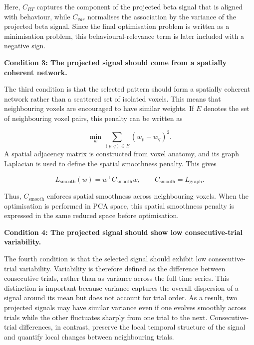 \documentclass[utf8]{frontiers_suppmat}
\begin{document}
Here, $C_{RT}$ captures the component of the projected beta signal that is aligned with behaviour, while $C_{var}$ normalises the association by the variance of the projected beta signal. Since the final optimisation problem is written as a minimisation problem, this behavioural-relevance term is later included with a negative sign.

\textbf{Condition 3: The projected signal should come from a spatially coherent network.}

The third condition is that the selected pattern should form a spatially coherent network rather than a scattered set of isolated voxels. This means that neighbouring voxels are encouraged to have similar weights. If $E$ denotes the set of neighbouring voxel pairs, this penalty can be written as

\begin{equation}
\min_w \sum_{(p,q)\in E} (w_p-w_q)^2.
\end{equation}
A spatial adjacency matrix is constructed from voxel anatomy, and its graph Laplacian is used to define the spatial smoothness penalty. This gives

\begin{equation}
L_{\mathrm{smooth}}(w) = w^\top C_{\mathrm{smooth}}w,
\qquad
C_{\mathrm{smooth}} = L_{\mathrm{graph}}.
\end{equation}

Thus, $C_{\mathrm{smooth}}$ enforces spatial smoothness across neighbouring voxels. When the optimisation is performed in PCA space, this spatial smoothness penalty is expressed in the same reduced space before optimisation.

\textbf{Condition 4: The projected signal should show low consecutive-trial variability.}

The fourth condition is that the selected signal should exhibit low consecutive-trial variability. Variability is therefore defined as the difference between consecutive trials, rather than as variance across the full time series. This distinction is important because variance captures the overall dispersion of a signal around its mean but does not account for trial order. As a result, two projected signals may have similar variance even if one evolves smoothly across trials while the other fluctuates sharply from one trial to the next. Consecutive-trial differences, in contrast, preserve the local temporal structure of the signal and quantify local changes between neighbouring trials.
\end{document}
